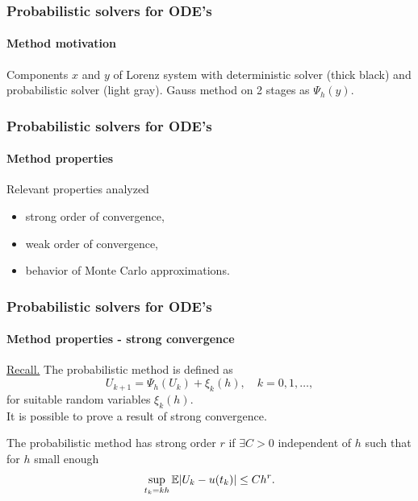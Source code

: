 \documentclass{beamer}
\newcommand{\E}{\mathbb{E}}
\begin{document}
\begin{frame}
	\frametitle{Probabilistic solvers for ODE's}
	\framesubtitle{Method motivation}
	
	\begin{figure}[t]
		\centering
		\begin{subfigure}{1\linewidth}
			\resizebox{1.0\linewidth}{!}{}
		\end{subfigure}
		\begin{subfigure}{1\linewidth}
			\resizebox{1.0\linewidth}{!}{}
		\end{subfigure}
	\end{figure}

	Components $x$ and $y$ of Lorenz system with deterministic solver (thick black) and probabilistic solver (light gray). Gauss method on 2 stages as $\Psi_h(y)$.
\end{frame}

\begin{frame}
	\frametitle{Probabilistic solvers for ODE's}
	\framesubtitle{Method properties}
	
	Relevant properties analyzed
	\begin{itemize}
		\item strong order of convergence,
		\item weak order of convergence,
		\item behavior of Monte Carlo approximations.
	\end{itemize}
	
\end{frame}


\begin{frame}
	\frametitle{Probabilistic solvers for ODE's}
	\framesubtitle{Method properties - strong convergence \cite{CGS16}}
	
	\underline{Recall.} The probabilistic method is defined as
	\begin{equation*}
		U_{k+1} = \Psi_h(U_k) + \xi_k(h), \quad k = 0, 1, \ldots,
	\end{equation*}
	for suitable random variables $\xi_k(h)$. \\[0.5cm]
	
	It is possible to prove a result of strong convergence.
	
	\begin{definition} The probabilistic method has strong order $r$ if $\exists C > 0$ independent of $h$ such that for $h$ small enough
		\begin{equation*}
			\sup_{t_k = kh} \E\abs{U_k - u(t_k)} \leq Ch^r.
		\end{equation*}
	\end{definition}
	
\end{frame}
	
\end{document}
